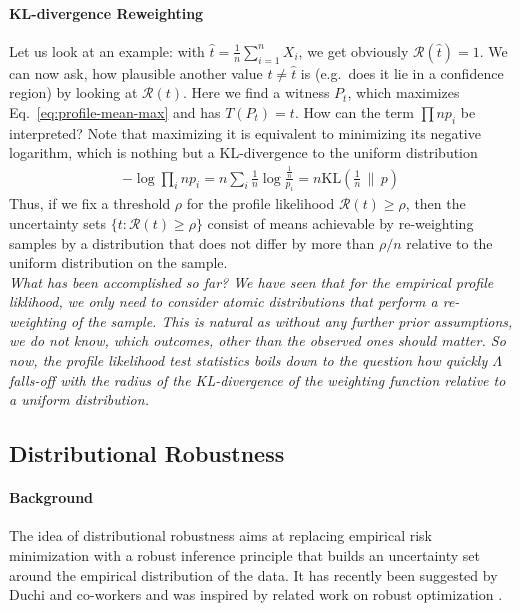 \documentclass{article}
\begin{document}
\paragraph{KL-divergence Reweighting} Let  us look at an example: with $\hat t = \frac 1n \sum_{i=1}^n X_i$, we get obviously $\mathcal R(\hat t)=1$. We can now ask, how plausible another value $t \neq \hat t$ is (e.g.~does it lie in a confidence region) by looking at $\mathcal R(t)$. Here we find a witness $P_t$, which maximizes Eq.~\eqref{eq:profile-mean-max} and has $T(P_t) = t$. How can the term $\prod n p_i$ be interpreted? Note that maximizing it is equivalent to minimizing its negative logarithm, which is nothing but a KL-divergence to the uniform distribution 
\begin{align}
- \log \prod_{i} n p_i =  n \sum_{i} \frac 1n \log \frac{\tfrac 1n }{p_i} = n \text{KL}\left(\tfrac1n \, \|\, p \right)
\end{align}
Thus, if we fix a threshold $\rho$ for the profile likelihood $\mathcal R(t)\ge \rho$, then the uncertainty sets $\{ t: \mathcal R(t) \geq \rho \}$ consist of means achievable by re-weighting samples by a distribution that does not differ by more than $\rho/n$ relative to the uniform distribution on the sample. \\

\textit{What has been accomplished so far? We have seen that for the empirical profile liklihood, we only need to consider atomic distributions that perform a re-weighting of the sample. This is natural as without any further prior assumptions, we do not know, which outcomes, other than the observed ones should matter. So now, the profile likelihood test statistics boils down to the question how quickly $\Lambda$ falls-off with the radius of the KL-divergence of the weighting function relative to a uniform distribution.} 

\subsection*{Distributional Robustness}

\paragraph{Background}

The idea of distributional robustness aims at replacing empirical risk minimization with a robust inference principle that builds an uncertainty set around the empirical distribution of the data. It has recently been suggested by Duchi and co-workers \cite{duchi2016statistics} and was inspired by related work on robust optimization \cite{ben2009robust,delage2010distributionally,ben2013robust,bertsimas2018data}.
\end{document}
